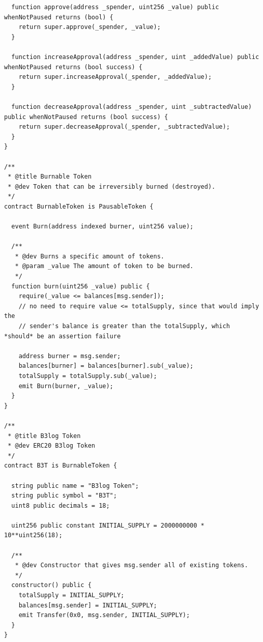 \documentclass[a4paper,12pt,titlepage]{ctexart}
\begin{document}
\begin{scriptsize}
\begin{verbatim}
  function approve(address _spender, uint256 _value) public whenNotPaused returns (bool) {
    return super.approve(_spender, _value);
  }

  function increaseApproval(address _spender, uint _addedValue) public whenNotPaused returns (bool success) {
    return super.increaseApproval(_spender, _addedValue);
  }

  function decreaseApproval(address _spender, uint _subtractedValue) public whenNotPaused returns (bool success) {
    return super.decreaseApproval(_spender, _subtractedValue);
  }
}

/**
 * @title Burnable Token
 * @dev Token that can be irreversibly burned (destroyed).
 */
contract BurnableToken is PausableToken {

  event Burn(address indexed burner, uint256 value);

  /**
   * @dev Burns a specific amount of tokens.
   * @param _value The amount of token to be burned.
   */
  function burn(uint256 _value) public {
    require(_value <= balances[msg.sender]);
    // no need to require value <= totalSupply, since that would imply the
    // sender's balance is greater than the totalSupply, which *should* be an assertion failure

    address burner = msg.sender;
    balances[burner] = balances[burner].sub(_value);
    totalSupply = totalSupply.sub(_value);
    emit Burn(burner, _value);
  }
}

/**
 * @title B3log Token
 * @dev ERC20 B3log Token
 */
contract B3T is BurnableToken {

  string public name = "B3log Token";
  string public symbol = "B3T";
  uint8 public decimals = 18;

  uint256 public constant INITIAL_SUPPLY = 2000000000 * 10**uint256(18);

  /**
   * @dev Constructor that gives msg.sender all of existing tokens.
   */
  constructor() public {
    totalSupply = INITIAL_SUPPLY;
    balances[msg.sender] = INITIAL_SUPPLY;
    emit Transfer(0x0, msg.sender, INITIAL_SUPPLY);
  }
}
\end{verbatim}
\end{scriptsize}
\restoregeometry

\newpage
\end{document}
